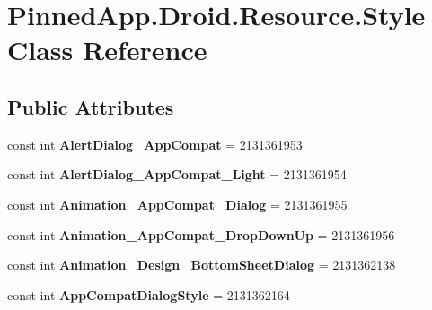 \hypertarget{class_pinned_app_1_1_droid_1_1_resource_1_1_style}{}\section{Pinned\+App.\+Droid.\+Resource.\+Style Class Reference}
\label{class_pinned_app_1_1_droid_1_1_resource_1_1_style}
\subsection*{Public Attributes}
\begin{DoxyCompactItemize}
\item 
\mbox{\label{class_pinned_app_1_1_droid_1_1_resource_1_1_style_a83608b4529cf05b6ed78e47dacc6fac7}} 
const int {\bfseries Alert\+Dialog\+\_\+\+App\+Compat} = 2131361953
\item 
\mbox{\label{class_pinned_app_1_1_droid_1_1_resource_1_1_style_af16a726432e2ba6d8639fd77069c649c}} 
const int {\bfseries Alert\+Dialog\+\_\+\+App\+Compat\+\_\+\+Light} = 2131361954
\item 
\mbox{\label{class_pinned_app_1_1_droid_1_1_resource_1_1_style_a26d18ec06123c4df72d7c33b33cff7ef}} 
const int {\bfseries Animation\+\_\+\+App\+Compat\+\_\+\+Dialog} = 2131361955
\item 
\mbox{\label{class_pinned_app_1_1_droid_1_1_resource_1_1_style_a5ab288e3878392c945758c31c72667ad}} 
const int {\bfseries Animation\+\_\+\+App\+Compat\+\_\+\+Drop\+Down\+Up} = 2131361956
\item 
\mbox{\label{class_pinned_app_1_1_droid_1_1_resource_1_1_style_a2d2dcda80799e665da6d2061d1c8a4b2}} 
const int {\bfseries Animation\+\_\+\+Design\+\_\+\+Bottom\+Sheet\+Dialog} = 2131362138
\item 
\mbox{\label{class_pinned_app_1_1_droid_1_1_resource_1_1_style_a8d8a835497da4fc330e6e2d65837fbd5}} 
const int {\bfseries App\+Compat\+Dialog\+Style} = 2131362164

\end{DoxyCompactItemize}
